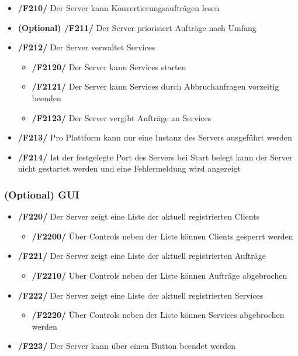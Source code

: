 \documentclass[11pt]{article} %
\begin{document}
\begin{itemize}
\item{\textbf{/F210/} Der Server kann Konvertierungsaufträgen lesen}
\item{\textbf{(Optional) /F211/} Der Server priorisiert Aufträge nach Umfang}
\item{\textbf{/F212/} Der Server verwaltet Services}

\begin{itemize}
\item{\textbf{/F2120/} Der Server kann Services starten}
\item{\textbf{/F2121/} Der Server kann Services durch Abbruchanfragen vorzeitig beenden}
\item{\textbf{/F2123/} Der Server vergibt Aufträge an Services}
\end{itemize}

\item{\textbf{/F213/} Pro Plattform kann nur eine Instanz des Servers ausgeführt werden}
\item{\textbf{/F214/} Ist der festgelegte Port des Servers bei Start belegt kann der Server nicht gestartet werden und eine Fehlermeldung wird angezeigt}
\end{itemize}

\subsubsection{(Optional) GUI}

\begin{itemize}
\item{\textbf{/F220/} Der Server zeigt eine Liste der aktuell registrierten Clients}

\begin{itemize}
\item{\textbf{/F2200/} Über Controls neben der Liste können Clients gesperrt werden}
\end{itemize}

\item{\textbf{/F221/} Der Server zeigt eine Liste der aktuell registrierten Aufträge}

\begin{itemize}
\item{\textbf{/F2210/} Über Controls neben der Liste können Aufträge abgebrochen}
\end{itemize}

\item{\textbf{/F222/} Der Server zeigt eine Liste der aktuell registrierten Services}

\begin{itemize}
\item{\textbf{/F2220/} Über Controls neben der Liste können Services abgebrochen werden}
\end{itemize}

\item{\textbf{/F223/} Der Server kann über einen Button beendet werden}
\end{itemize}
\end{document}
